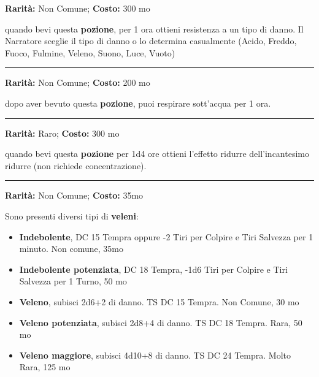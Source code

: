 \begin{multicols}{2}
\textbf{Rarità:} Non Comune; \textbf{Costo:} 300 mo

quando bevi questa \textbf{pozione}, per 1 ora ottieni resistenza a un tipo di danno. Il Narratore sceglie il tipo di danno o lo determina casualmente (Acido, Freddo, Fuoco, Fulmine, Veleno, Suono, Luce, Vuoto)

\smallskip\noindent\rule{\linewidth}{2pt}  \hypertarget{PozionediRespirareSott'Acqua}{}\smallskip{}\noindent\label{PozionediRespirareSott'Acqua}

\textbf{Rarità:} Non Comune; \textbf{Costo:} 200 mo

dopo aver bevuto questa \textbf{pozione}, puoi respirare sott'acqua per 1 ora.

\smallskip\noindent\rule{\linewidth}{2pt}  \hypertarget{PozionediRimpicciolimento}{}\smallskip{}\noindent\label{PozionediRimpicciolimento}

\textbf{Rarità:} Raro; \textbf{Costo:} 300 mo

quando bevi questa \textbf{pozione} per 1d4 ore ottieni l'effetto ridurre dell'incantesimo  ridurre (non richiede concentrazione).

\smallskip\noindent\rule{\linewidth}{2pt}  \hypertarget{PozionediVeleno}{}\smallskip{}\noindent\label{PozionediVeleno}

\textbf{Rarità:} Non Comune; \textbf{Costo:} 35mo

Sono presenti diversi tipi di \textbf{veleni}:

\begin{itemize} \setlength\itemsep{0em}
\item \textbf{Indebolente}, DC 15 Tempra oppure -2 Tiri per Colpire e Tiri Salvezza per 1 minuto. Non comune, 35mo
\item \textbf{Indebolente potenziata}, DC 18 Tempra, -1d6 Tiri per Colpire e Tiri Salvezza per 1 Turno, 50 mo
\item \textbf{Veleno}, subisci 2d6+2 di danno. TS DC 15 Tempra. Non Comune, 30 mo
\item \textbf{Veleno potenziata}, subisci 2d8+4 di danno. TS DC 18 Tempra. Rara, 50 mo
\item \textbf{Veleno maggiore}, subisci 4d10+8 di danno. TS DC 24 Tempra. Molto Rara, 125 mo
\end{itemize}


\end{multicols}
